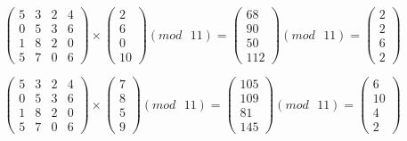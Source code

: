 \documentclass[a5paper, 10pt]{article}
\theoremstyle{definition}
\theoremstyle{plain}
\theoremstyle{remark}
\begin{document}
\begin{equation}
\begin{pmatrix}
 5 & 3 & 2 & 4 \\
 0 & 5 & 3 & 6 \\
1& 8 & 2 & 0\\
 5 & 7 & 0 & 6
\end{pmatrix}
 \times
\begin{pmatrix}
 2\\
6\\
0\\
10
\end{pmatrix}
(mod \text{ }11)
= 
\begin{pmatrix}
68\\
90\\
50\\
112
\end{pmatrix}
(mod \text{ }11)
= \begin{pmatrix}
2\\
2\\
6\\
2
\end{pmatrix}
\end{equation}

\begin{equation}
\begin{pmatrix}
 5 & 3 & 2 & 4 \\
 0 & 5 & 3 & 6 \\
1& 8 & 2 & 0\\
 5 & 7 & 0 & 6
\end{pmatrix}
 \times
\begin{pmatrix}
7\\
8\\
 5\\
9
\end{pmatrix}
(mod \text{ }11)
= 
\begin{pmatrix}
105\\
109\\
81\\
145
\end{pmatrix}
(mod \text{ }11)
= \begin{pmatrix}
6\\
10\\
4\\
2
\end{pmatrix}
\end{equation}
\end{document}
